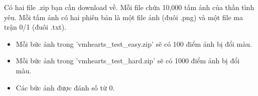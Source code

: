 Có hai file .zip bạn cần download về. Mỗi file chứa 10,000 tấm ảnh của thần tình yêu. Mỗi tấm ảnh có hai phiên bản là một file ảnh (đuôi .png) và một file ma trận 0/1 (đuôi .txt).
\begin{itemize}
	\item Mỗi bức ảnh trong 'vmhearts\_test\_easy.zip' sẽ có 100 điểm ảnh bị đổi màu. 
	\item Mỗi bức ảnh trong 'vmhearts\_test\_hard.zip' sẽ có 1000 điểm ảnh bị đổi màu.  
	\item Các bức ảnh được đánh số từ 0. 
\end{itemize}